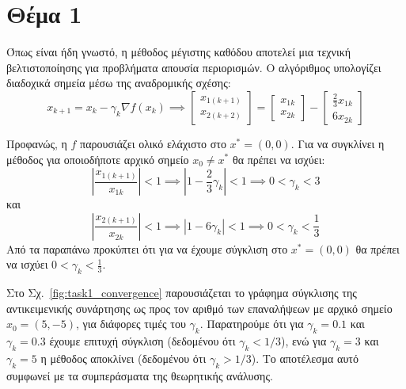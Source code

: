 \documentclass[a4paper,12pt]{article}
\begin{document}
\section*{Θέμα 1}
Όπως είναι ήδη γνωστό, η μέθοδος μέγιστης καθόδου αποτελεί μια τεχνική βελτιστοποίησης για προβλήματα απουσία 
περιορισμών. Ο αλγόριθμος υπολογίζει διαδοχικά σημεία μέσω της αναδρομικής σχέσης: 
\[
x_{k+1} = x_k - \gamma_k \nabla f(x_k) \implies 
\begin{bmatrix} x_{1(k+1)} \\ x_{2(k+2)} \end{bmatrix} = 
\begin{bmatrix} x_{1k} \\ x_{2k} \end{bmatrix}
 - \begin{bmatrix} \frac{2}{3} x_{1k} \\ 6 x_{2k} \end{bmatrix}
\]

Προφανώς, η $f$ παρουσιάζει ολικό ελάχιστο στο $x^* = (0,0)$. Για να συγκλίνει η μέθοδος για οποιοδήποτε αρχικό
σημείο $x_0 \neq x^*$ θα πρέπει να ισχύει:
\[
\left|\frac{x_{1(k+1)}}{x_{1k}}\right| < 1 \implies \left|1 - \frac{2}{3} \gamma_k \right| < 1 
\implies 0 < \gamma_k < 3
\]
και
\[
\left|\frac{x_{2(k+1)}}{x_{2k}}\right| < 1 \implies \left|1 - 6 \gamma_k \right| < 1 
\implies 0 < \gamma_k < \frac{1}{3}
\]
Από τα παραπάνω προκύπτει ότι για να έχουμε σύγκλιση στο $x^* = (0,0)$ θα πρέπει να ισχύει $0 < \gamma_k < \frac{1}{3}$.

Στο Σχ.~\ref{fig:task1_convergence} παρουσιάζεται το γράφημα σύγκλισης της αντικειμενικής συνάρτησης ως προς τον αριθμό 
των επαναλήψεων με αρχικό σημείο $x_0 = (5, -5)$, για διάφορες τιμές του $\gamma_k$. Παρατηρούμε ότι για $\gamma_k = 0.1$ 
και $\gamma_k = 0.3$ έχουμε επιτυχή σύγκλιση (δεδομένου ότι $\gamma_k < 1/3$), ενώ για $\gamma_k = 3$ και $\gamma_k = 5$
η μέθοδος αποκλίνει (δεδομένου ότι $\gamma_k > 1/3$). Το αποτέλεσμα αυτό συμφωνεί με τα συμπεράσματα της θεωρητικής 
ανάλυσης.
\end{document}
